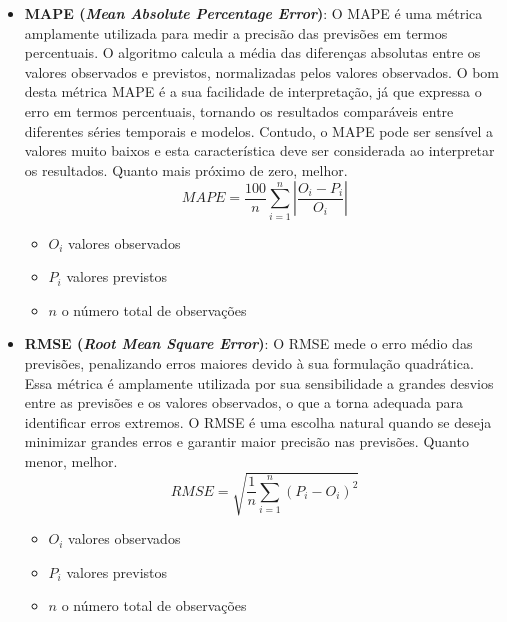 \begin{itemize}
\item \textbf{MAPE (\textit{Mean Absolute Percentage Error})}: O MAPE é uma métrica amplamente utilizada para medir a precisão das previsões em termos percentuais. O algoritmo calcula a média das diferenças absolutas entre os valores observados e previstos, normalizadas pelos valores observados. O bom desta métrica MAPE é a sua facilidade de interpretação, já que expressa o erro em termos percentuais, tornando os resultados comparáveis entre diferentes séries temporais e modelos. Contudo, o MAPE pode ser sensível a valores muito baixos e esta característica deve ser considerada ao interpretar os resultados. Quanto mais próximo de zero, melhor.
\begin{equation}
MAPE = \frac{100}{n} \sum_{i=1}^{n} \left| \frac{O_i - P_i}{O_i} \right|
\end{equation}
\begin{itemize}
	\item $O_i$ valores observados
	\item $P_i$ valores previstos
	\item $n$ o número total de observações
\end{itemize}

\item \textbf{RMSE (\textit{Root Mean Square Error})}: O RMSE mede o erro médio das previsões, penalizando erros maiores devido à sua formulação quadrática. Essa métrica é amplamente utilizada por sua sensibilidade a grandes desvios entre as previsões e os valores observados, o que a torna adequada para identificar erros extremos. O RMSE é uma escolha natural quando se deseja minimizar grandes erros e garantir maior precisão nas previsões. Quanto menor, melhor.
\begin{equation}
RMSE = \sqrt{\frac{1}{n} \sum_{i=1}^{n} (P_i - O_i)^2}
\end{equation}
\begin{itemize}
	\item $O_i$ valores observados
	\item $P_i$ valores previstos
	\item $n$ o número total de observações
\end{itemize}


\end{itemize}
